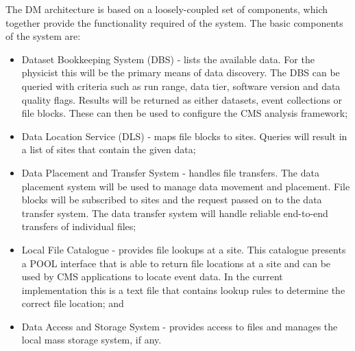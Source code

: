 The DM architecture is based on a loosely-coupled set of components, which together provide the functionality required of the system. The basic components of the system are:
\begin{itemize}
\item Dataset Bookkeeping System (DBS) - lists the available data. For the physicist this will be the primary means of data discovery. The DBS can be queried with criteria such as run range, data tier, software version and data quality flags. Results will be returned as either datasets, event collections or file blocks. These can then be used to configure the CMS analysis framework;
\item Data Location Service (DLS) - maps file blocks to sites. Queries will result in a list of sites that contain the given data;
\item Data Placement and Transfer System - handles file transfers. The data placement system will be used to manage data movement and placement. File blocks will be subscribed to sites and the request passed on to the data transfer system. The data transfer system will handle reliable end-to-end transfers of individual files;
\item Local File Catalogue - provides file lookups at a site. This catalogue presents a POOL interface that is able to return file locations at a site and can be used by CMS applications to locate event data. In the current implementation this is a text file that contains lookup rules to determine the correct file location; and
\item Data Access and Storage System - provides access to files and manages the local mass storage system, if any.
\end{itemize}


